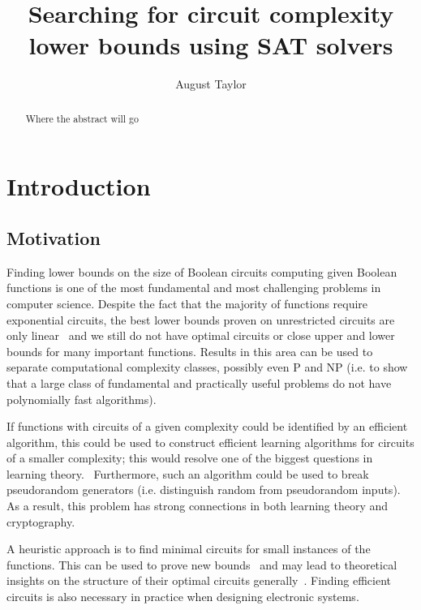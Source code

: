 \documentclass{article}
\begin{document}
\begin{titlepage}
\title{Searching for circuit complexity lower bounds using SAT solvers}
\author{August Taylor}
\maketitle
\end{titlepage}

\begin{abstract}
Where the abstract will go
\end{abstract}

\tableofcontents

\section{Introduction}

\subsection{Motivation}

Finding lower bounds on the size of Boolean circuits computing given Boolean functions is one of the most fundamental and most challenging problems in computer science. Despite the fact that the majority of functions require exponential circuits, the best lower bounds proven on unrestricted circuits are only linear~\cite{boppana} and we still do not have optimal circuits or close upper and lower bounds for many important functions. Results in this area can be used to separate computational complexity classes, possibly even P and NP (i.e. to show that a large class of fundamental and practically useful problems do not have polynomially fast algorithms).~\cite{arora} 

If functions with circuits of a given complexity could be identified by an efficient algorithm, this could be used to construct efficient learning algorithms for circuits of a smaller complexity; this would resolve one of the biggest questions in learning theory.~\cite{carmosino} Furthermore, such an algorithm could be used to break pseudorandom generators (i.e. distinguish random from pseudorandom inputs).~\cite{arora} As a result, this problem has strong connections in both learning theory and cryptography.

A heuristic approach is to find minimal circuits for small instances of the functions. This can be used to prove new bounds~\cite{kulikovsurvey} and may lead to theoretical insights on the structure of their optimal circuits generally~\cite{williams}. Finding efficient circuits is also necessary in practice when designing electronic systems. 
\end{document}
